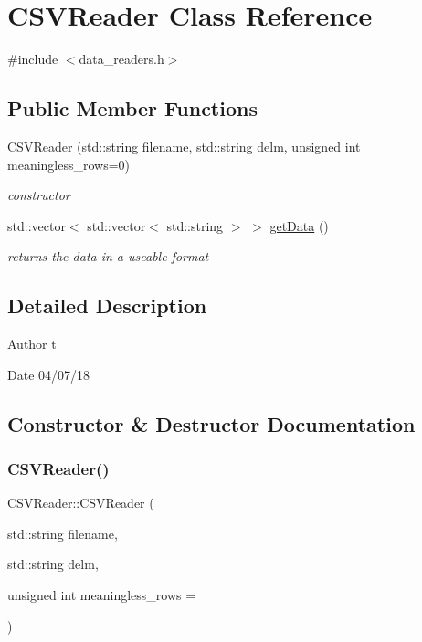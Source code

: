 \hypertarget{classCSVReader}{}\section{C\+S\+V\+Reader Class Reference}
\label{classCSVReader}


{\ttfamily \#include $<$data\+\_\+readers.\+h$>$}

\subsection*{Public Member Functions}
\begin{DoxyCompactItemize}
\item 
\hyperlink{classCSVReader_ac1762e2bc34242f58083979260d02f98}{C\+S\+V\+Reader} (std\+::string filename, std\+::string delm, unsigned int meaningless\+\_\+rows=0)
\begin{DoxyCompactList}\small\item\em constructor \end{DoxyCompactList}\item 
std\+::vector$<$ std\+::vector$<$ std\+::string $>$ $>$ \hyperlink{classCSVReader_a809c75b0401dd459b88102c2dcaefadd}{get\+Data} ()
\begin{DoxyCompactList}\small\item\em returns the data in a useable format \end{DoxyCompactList}\end{DoxyCompactItemize}


\subsection{Detailed Description}
\begin{DoxyAuthor}{Author}
t 
\end{DoxyAuthor}
\begin{DoxyDate}{Date}
04/07/18 
\end{DoxyDate}


\subsection{Constructor \& Destructor Documentation}
\mbox{\label{classCSVReader_ac1762e2bc34242f58083979260d02f98}} 
\subsubsection{\texorpdfstring{C\+S\+V\+Reader()}{CSVReader()}}
{\footnotesize\ttfamily C\+S\+V\+Reader\+::\+C\+S\+V\+Reader (\begin{DoxyParamCaption}\item[{std\+::string}]{filename,  }\item[{std\+::string}]{delm,  }\item[{unsigned int}]{meaningless\+\_\+rows = {} }\end{DoxyParamCaption})}




